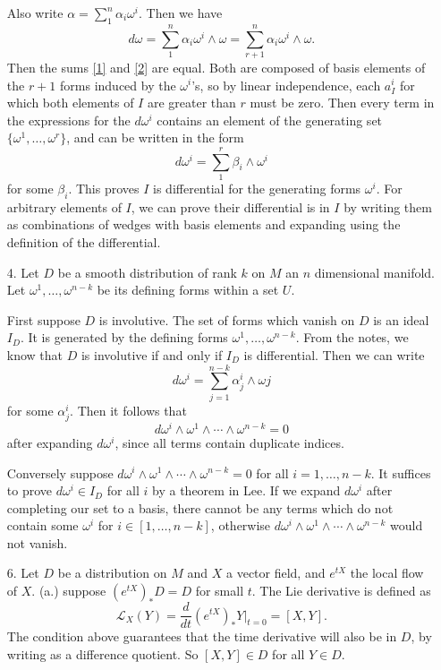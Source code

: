 \documentclass[11pt, reqno]{article}
\theoremstyle{plain}
\theoremstyle{definition}
\theoremstyle{remark}
\begin{document}
\begin{enumerate}
    
    Also write $\alpha = \sum_1^n \alpha_i \omega^i$. Then we have
    \begin{equation}\label{2}
        d\omega = \sum_1^n \alpha_i \omega^i \wedge \omega = \sum_{r + 1}^n \alpha_i \omega^i \wedge \omega.
    \end{equation}
    Then the sums \ref{1} and \ref{2} are equal. Both are composed of basis elements of the $r + 1$ forms induced by 
    the $\omega^i$'s, so by linear independence, each $a_I^i$ for which both elements of $I$ are greater than
    $r$ must be zero. Then every term in the expressions for the $d\omega^i$ contains an element of the 
    generating set $\{\omega^1,\dots, \omega^r\}$, and can be written in the form
    \[
        d\omega^i = \sum_1^r \beta_i \wedge \omega^i
    \]
    for some $\beta_i$. This proves $I$ is differential for the generating forms $\omega^i$. For 
    arbitrary elements of $I$, we can prove their differential is in $I$ by writing them as combinations
    of wedges with basis elements and expanding using the definition of the differential.

    \item[4.] Let $D$ be a smooth distribution of rank $k$ on $M$ an $n$ dimensional manifold. Let $\omega^1,
    \dots, \omega^{n-k}$ be its defining forms within a set $U$. 

    First suppose $D$ is involutive. The set of forms which vanish on $D$ is an ideal $I_D$. It is generated
    by the defining forms $\omega^1, \dots, \omega^{n-k}$. From the notes, we know that $D$ is involutive
    if and only if $I_D$ is differential. Then we can write 
    \[
        d\omega^i = \sum_{j = 1}^{n-k} \alpha_j^i \wedge \omega j
    \]
    for some $\alpha_j^i$. Then it follows that 
    \[
        d\omega^i\wedge\omega^1 \wedge \cdots \wedge \omega^{n-k} = 0
    \]
    after expanding $d\omega^i$, since all terms contain duplicate indices. 

    Conversely suppose $d\omega^i \wedge \omega^1 \wedge \cdots \wedge \omega^{n-k} = 0$ for all $i = 1, \dots, n-k$.
    It suffices to prove $d\omega^i \in I_D$ for all $i$ by a theorem in Lee. If we expand $d\omega^i$
    after completing our set to a basis, there cannot be any terms which do not contain some $\omega^i$
    for $i \in [1, \dots, n-k]$,
    otherwise $d\omega^i \wedge \omega^1 \wedge \cdots \wedge \omega^{n-k}$ would not vanish. 

    \item[6.] Let $D$ be a distribution on $M$ and $X$ a vector field, and $e^{tX}$ the local flow of $X$. 
    (a.) suppose $(e^{tX})_* D = D$ for small $t$. The Lie derivative is defined as 
    \[
        \mathcal{L}_X(Y) = \frac{d}{dt}(e^{tX})_* Y|_{t = 0} = [X, Y].
    \]
    The condition above guarantees that the time derivative will also be in $D$, by writing as a difference quotient.
    So $[X,Y] \in D$ for all $Y \in D$. 


\end{enumerate}
\end{document}

